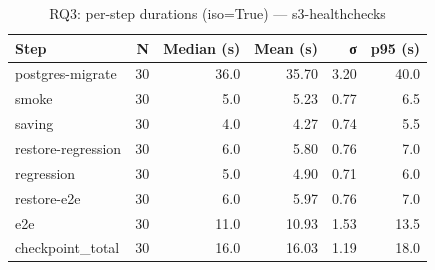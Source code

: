 \begin{table}[htbp]
\centering
\small
\caption{RQ3: per-step durations (iso=True) — s3-healthchecks}
\label{tab:rq3-s3-healthchecks-steps}
\begin{tabular}{lrrrrr}
\toprule
\textbf{Step} & \textbf{N} & \textbf{Median (s)} & \textbf{Mean (s)} & \textbf{σ} & \textbf{p95 (s)} \\
\midrule
postgres-migrate & 30 & 36.0 & 35.70 & 3.20 & 40.0 \\
smoke & 30 & 5.0 & 5.23 & 0.77 & 6.5 \\
saving & 30 & 4.0 & 4.27 & 0.74 & 5.5 \\
restore-regression & 30 & 6.0 & 5.80 & 0.76 & 7.0 \\
regression & 30 & 5.0 & 4.90 & 0.71 & 6.0 \\
restore-e2e & 30 & 6.0 & 5.97 & 0.76 & 7.0 \\
e2e & 30 & 11.0 & 10.93 & 1.53 & 13.5 \\
checkpoint_total & 30 & 16.0 & 16.03 & 1.19 & 18.0 \\
\bottomrule
\end{tabular}
\end{table}
